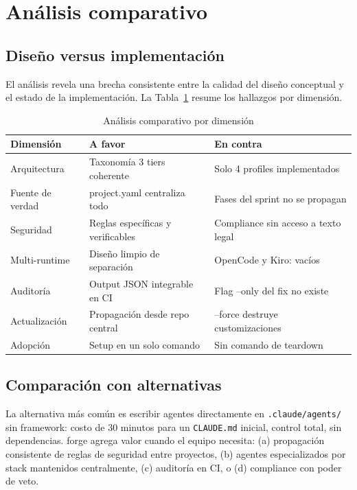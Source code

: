 \documentclass[12pt,a4paper]{article}
\begin{document}
\section{Análisis comparativo}

\subsection{Diseño versus implementación}

El análisis revela una brecha consistente entre la calidad del diseño conceptual y
el estado de la implementación. La Tabla~\ref{tab:comparativa} resume los hallazgos
por dimensión.

\begin{table}[h]
\centering
\caption{Análisis comparativo por dimensión}
\label{tab:comparativa}
\begin{tabular}{@{}p{3.5cm}p{5cm}p{5cm}@{}}
\toprule
\textbf{Dimensión} & \textbf{A favor} & \textbf{En contra} \\
\midrule
Arquitectura & Taxonomía 3 tiers coherente & Solo 4 profiles implementados \\
\midrule
Fuente de verdad & project.yaml centraliza todo & Fases del sprint no se propagan \\
\midrule
Seguridad & Reglas específicas y verificables & Compliance sin acceso a texto legal \\
\midrule
Multi-runtime & Diseño limpio de separación & OpenCode y Kiro: vacíos \\
\midrule
Auditoría & Output JSON integrable en CI & Flag --only del fix no existe \\
\midrule
Actualización & Propagación desde repo central & --force destruye customizaciones \\
\midrule
Adopción & Setup en un solo comando & Sin comando de teardown \\
\bottomrule
\end{tabular}
\end{table}

\subsection{Comparación con alternativas}

La alternativa más común es escribir agentes directamente en \texttt{.claude/agents/}
sin framework: costo de 30 minutos para un \texttt{CLAUDE.md} inicial, control total,
sin dependencias. forge agrega valor cuando el equipo necesita: (a) propagación
consistente de reglas de seguridad entre proyectos, (b) agentes especializados por
stack mantenidos centralmente, (c) auditoría en CI, o (d) compliance con poder de veto.
\end{document}
